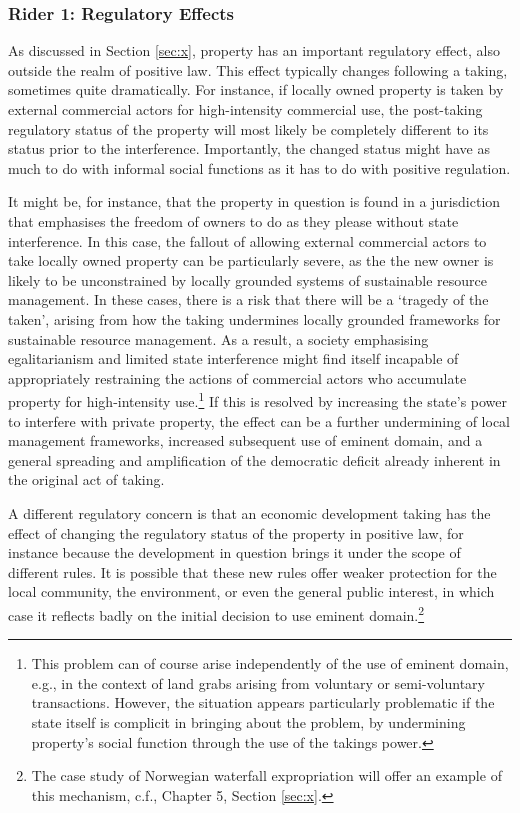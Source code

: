 \subsubsection*{Rider 1: Regulatory Effects}

As discussed in Section \ref{sec:x}, property has an important regulatory effect, also outside the realm of positive law. This effect typically changes following a taking, sometimes quite dramatically.  For instance, if locally owned property is taken by external commercial actors for high-intensity commercial use, the post-taking regulatory status of the property will most likely be completely different to its status prior to the interference. Importantly, the changed status might have as much to do with informal social functions as it has to do with positive regulation.

It might be, for instance, that the property in question is found in a jurisdiction that emphasises  the freedom of owners to do as they please without state interference. In this case, the fallout of allowing external commercial actors to take locally owned property can be particularly severe, as the the new owner is likely to be unconstrained by locally grounded systems of sustainable resource management. In these cases, there is a risk that there will be a `tragedy of the taken', arising from how the taking undermines locally grounded frameworks for sustainable resource management. As a result, a society emphasising egalitarianism and limited state interference might find itself incapable of appropriately restraining the actions of commercial actors who accumulate property for high-intensity use.\footnote{This problem can of course arise independently of the use of eminent domain, e.g., in the context of land grabs arising from voluntary or semi-voluntary transactions. However, the situation appears particularly problematic if the state itself is complicit in bringing about the problem, by undermining property's social function through the use of the takings power.} If this is resolved by increasing the state's power to interfere with private property, the effect can be a further undermining of local management frameworks, increased subsequent use of eminent domain, and a general spreading and amplification of the democratic deficit already inherent in the original act of taking.

A different regulatory concern is that an economic development taking has the effect of changing the regulatory status of the property in positive law, for instance because the development in question brings it under the scope of different rules. It is possible that these new rules offer weaker protection for the local community, the environment, or even the general public interest, in which case it reflects badly on the initial decision to use eminent domain.\footnote{The case study of Norwegian waterfall expropriation will offer an example of this mechanism, c.f., Chapter 5, Section \ref{sec:x}.}

